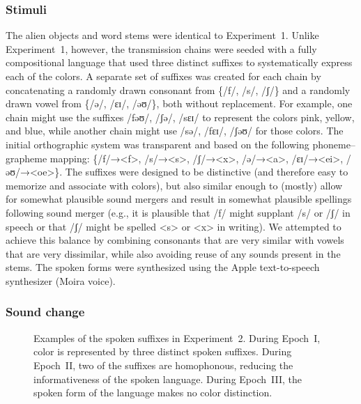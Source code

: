 \documentclass[doc,biblatex]{apa7}
\begin{document}
\subsubsection{Stimuli}

The alien objects and word stems were identical to Experiment~1. Unlike Experiment~1, however, the transmission chains were seeded with a fully compositional language that used three distinct suffixes to systematically express each of the colors. A separate set of suffixes was created for each chain by concatenating a randomly drawn consonant from \{/f/, /s/, /ʃ/\} and a randomly drawn vowel from \{/ə/, /ɛɪ/, /əʊ/\}, both without replacement. For example, one chain might use the suffixes /fəʊ/, /ʃə/, /sɛɪ/ to represent the colors pink, yellow, and blue, while another chain might use /sə/, /fɛɪ/, /ʃəʊ/ for those colors. The initial orthographic system was transparent and based on the following phoneme–grapheme mapping: \{/f/→<f>, /s/→<s>, /ʃ/→<x>, /ə/→<a>, /ɛɪ/→<ei>, /əʊ/→<oe>\}. The suffixes were designed to be distinctive (and therefore easy to memorize and associate with colors), but also similar enough to (mostly) allow for somewhat plausible sound mergers and result in somewhat plausible spellings following sound merger (e.g., it is plausible that /f/ might supplant /s/ or /ʃ/ in speech or that /ʃ/ might be spelled <s> or <x> in writing). We attempted to achieve this balance by combining consonants that are very similar with vowels that are very dissimilar, while also avoiding reuse of any sounds present in the stems. The spoken forms were synthesized using the Apple text-to-speech synthesizer (Moira voice).

\subsubsection{Sound change}

	\begin{figure}
	\vspace*{2pt}
	\caption{Examples of the spoken suffixes in Experiment~2. During Epoch~I, color is represented by three distinct spoken suffixes. During Epoch~II, two of the suffixes are homophonous, reducing the informativeness of the spoken language. During Epoch~III, the spoken form of the language makes no color distinction.}
	\label{fig08}
	\end{figure}
\end{document}

